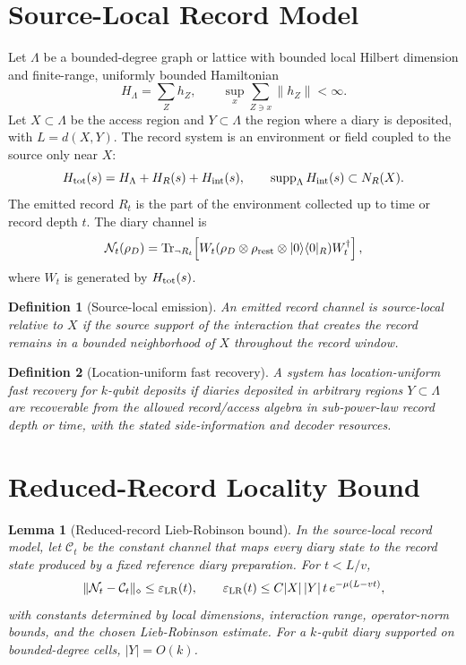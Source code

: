 \documentclass[11pt]{article}
\newtheorem{lemma}{Lemma}
\newtheorem{definition}{Definition}
\newcommand{\cN}{\mathcal N}
\newcommand{\cC}{\mathcal C}
\newcommand{\Tr}{\operatorname{Tr}}
\begin{document}
\section{Source-Local Record Model}

Let $\Lambda$ be a bounded-degree graph or lattice with bounded local
Hilbert dimension and finite-range, uniformly bounded Hamiltonian
\begin{equation}
  H_\Lambda=\sum_Z h_Z,
  \qquad
  \sup_x \sum_{Z\ni x}\lVert h_Z\rVert < \infty .
\end{equation}
Let $X\subset\Lambda$ be the access region and $Y\subset\Lambda$ the
region where a diary is deposited, with $L=d(X,Y)$.  The record system
is an environment or field coupled to the source only near $X$:
\begin{equation}
  H_{\rm tot}(s)=H_\Lambda+H_R(s)+H_{\rm int}(s),
  \qquad
  \operatorname{supp}_\Lambda H_{\rm int}(s)\subset N_R(X).
\end{equation}
The emitted record $R_t$ is the part of the environment collected up to
time or record depth $t$.  The diary channel is
\begin{equation}
  \cN_t(\rho_D)
  =
  \Tr_{\neg R_t}\!\left[
  W_t(\rho_D\otimes\rho_{\rm rest}\otimes |0\rangle\langle 0|_R)
  W_t^\dagger
  \right],
\end{equation}
where $W_t$ is generated by $H_{\rm tot}(s)$.

\begin{definition}[Source-local emission]
An emitted record channel is source-local relative to $X$ if the source
support of the interaction that creates the record remains in a bounded
neighborhood of $X$ throughout the record window.
\end{definition}

\begin{definition}[Location-uniform fast recovery]
A system has location-uniform fast recovery for $k$-qubit deposits if
diaries deposited in arbitrary regions $Y\subset\Lambda$ are recoverable
from the allowed record/access algebra in sub-power-law record depth or
time, with the stated side-information and decoder resources.
\end{definition}

\section{Reduced-Record Locality Bound}

\begin{lemma}[Reduced-record Lieb-Robinson bound]
\label{lem:reduced-lr}
In the source-local record model, let $\cC_t$ be the constant channel
that maps every diary state to the record state produced by a fixed
reference diary preparation.  For $t<L/v$,
\begin{equation}
  \lVert \cN_t-\cC_t\rVert_\diamond
  \le
  \varepsilon_{\rm LR}(t),
  \qquad
  \varepsilon_{\rm LR}(t)
  \le
  C |X|\,|Y|\, t\, e^{-\mu(L-vt)} ,
\end{equation}
with constants determined by local dimensions, interaction range,
operator-norm bounds, and the chosen Lieb-Robinson estimate.  For a
$k$-qubit diary supported on bounded-degree cells, $|Y|=O(k)$.
\end{lemma}
\end{document}
